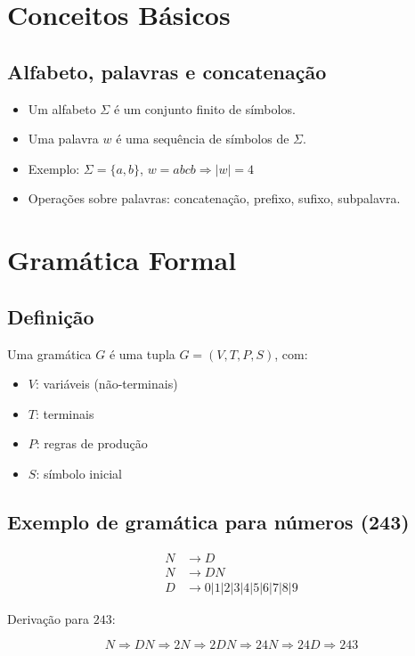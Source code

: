 \documentclass[12pt]{article}
\begin{document}
\section*{Conceitos Básicos}

\subsection*{Alfabeto, palavras e concatenação}

\begin{itemize}
  \item Um alfabeto $\Sigma$ é um conjunto finito de símbolos.
  \item Uma palavra $w$ é uma sequência de símbolos de $\Sigma$.
  \item Exemplo: $\Sigma = \{a,b\}$, $w = abcb \Rightarrow |w| = 4$
  \item Operações sobre palavras: concatenação, prefixo, sufixo, subpalavra.
\end{itemize}

\section*{Gramática Formal}

\subsection*{Definição}
Uma gramática $G$ é uma tupla $G = (V, T, P, S)$, com:
\begin{itemize}
  \item $V$: variáveis (não-terminais)
  \item $T$: terminais
  \item $P$: regras de produção
  \item $S$: símbolo inicial
\end{itemize}

\subsection*{Exemplo de gramática para números (243)}

\begin{align*}
  N &\rightarrow D \\
  N &\rightarrow DN \\
  D &\rightarrow 0|1|2|3|4|5|6|7|8|9
\end{align*}

Derivação para $243$:

\[
N \Rightarrow DN \Rightarrow 2N \Rightarrow 2DN \Rightarrow 24N \Rightarrow 24D \Rightarrow 243
\]
\end{document}
